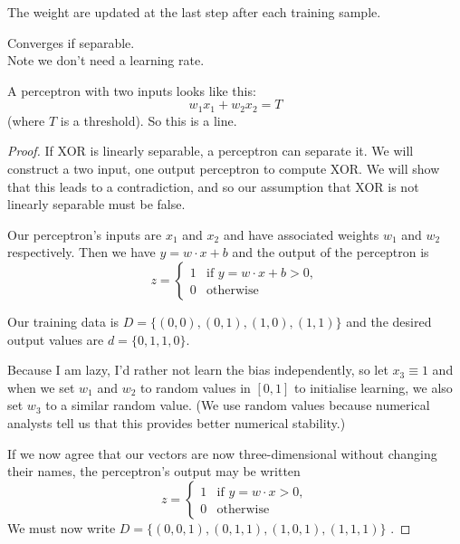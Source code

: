 The weight are updated at the last step after each training sample.

Converges if separable.\\
Note we don't need a learning rate.

A perceptron with two inputs looks like this:
\begin{displaymath}
  w_1 x_1 + w_2 x_2 = T
\end{displaymath}
(where $T$ is a threshold).  So this is a line.



\bigskip

\begin{proof}

  If XOR is linearly separable, a perceptron can separate it.
  We will construct a two input, one output perceptron to compute XOR.
  We will show that this leads to a contradiction, and so our
  assumption that XOR is not linearly separable must be false.

  Our perceptron's inputs are $x_1$ and $x_2$ and have associated
  weights $w_1$ and $w_2$ respectively.  Then we have $y=w\cdot x + b$
  and the output of the perceptron is
  \begin{displaymath}
    z = \begin{cases}
      1 & \mbox{if } y = w\cdot x + b > 0, \\
      0 & \mbox{otherwise}
    \end{cases}
  \end{displaymath}

  Our training data is $D=\{ (0, 0), (0, 1), (1, 0), (1, 1) \}$ and the
  desired output values are $d=\{0, 1, 1, 0\}$.

  Because I am lazy, I'd rather not learn the bias independently, so
  let $x_3\equiv 1$ and when we set $w_1$ and $w_2$ to random values
  in $[0,1]$ to initialise learning, we also set $w_3$ to a similar
  random value.  (We use random values because numerical analysts tell
  us that this provides better numerical stability.)

  If we now agree that our vectors are now three-dimensional without
  changing their names, the perceptron's output may be written
  \begin{equation}
    \label{z}
    z = \begin{cases}
      1 & \mbox{if } y = w\cdot x > 0, \\
      0 & \mbox{otherwise}
    \end{cases}
  \end{equation}
  We must now write $D=\{ (0, 0, 1), (0, 1, 1), (1, 0, 1), (1, 1, 1) \}$ .


\end{proof}
